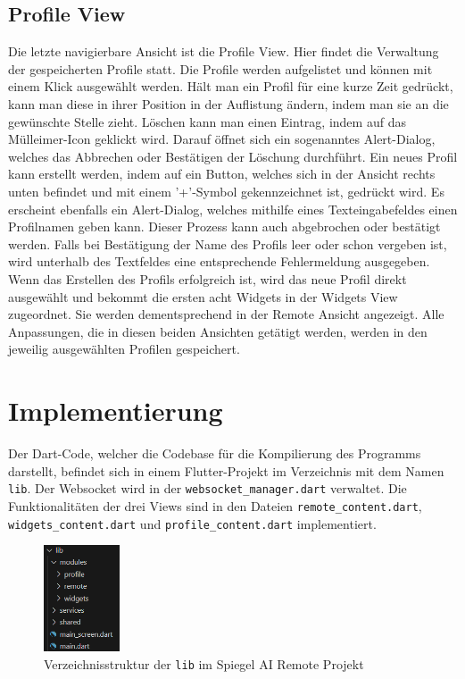 \subsection{Profile View}
Die letzte navigierbare Ansicht ist die Profile View. Hier findet die Verwaltung der gespeicherten Profile statt. Die Profile werden aufgelistet und können mit einem Klick ausgewählt werden. Hält man ein Profil für eine kurze Zeit gedrückt, kann man diese in ihrer Position in der Auflistung ändern, indem man sie an die gewünschte Stelle zieht. Löschen kann man einen Eintrag, indem auf das Mülleimer-Icon geklickt wird. Darauf öffnet sich ein sogenanntes Alert-Dialog, welches das Abbrechen oder Bestätigen der Löschung durchführt. Ein neues Profil kann erstellt werden, indem auf ein Button, welches sich in der Ansicht rechts unten befindet und mit einem '+'-Symbol gekennzeichnet ist, gedrückt wird. Es erscheint ebenfalls ein Alert-Dialog, welches mithilfe eines Texteingabefeldes einen Profilnamen geben kann. Dieser Prozess kann auch abgebrochen oder bestätigt werden. Falls bei Bestätigung der Name des Profils leer oder schon vergeben ist, wird unterhalb des Textfeldes eine entsprechende Fehlermeldung ausgegeben. Wenn das Erstellen des Profils erfolgreich ist, wird das neue Profil direkt ausgewählt und bekommt die ersten acht Widgets in der Widgets View zugeordnet. Sie werden dementsprechend in der Remote Ansicht angezeigt. Alle Anpassungen, die in diesen beiden Ansichten getätigt werden, werden in den jeweilig ausgewählten Profilen gespeichert.

\section{Implementierung}
\sloppy
Der Dart-Code, welcher die Codebase für die Kompilierung des Programms darstellt, befindet sich in einem Flutter-Projekt im Verzeichnis mit dem Namen \texttt{lib}. Der Websocket wird in der \texttt{websocket\_manager.dart} verwaltet. Die Funktionalitäten der drei Views sind in den Dateien \texttt{remote\_content.dart}, \texttt{widgets\_content.dart} und \texttt{profile\_content.dart} implementiert.
\begin{figure}[h]
    \centering
    \includegraphics[width=0.2\textwidth]{pictures/flutter_directories.png}
    \captionsetup{justification=centering, labelformat=simple, singlelinecheck=false}
    \caption{Verzeichnisstruktur der \texttt{lib} im Spiegel AI Remote Projekt}
    \label{fig:flutter_directories}
\end{figure}

